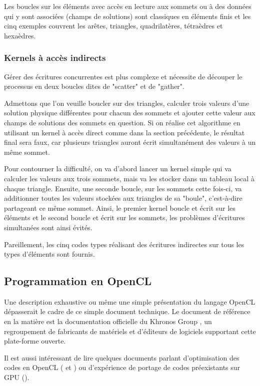 \documentclass[a4paper,12pt]{article}
\begin{document}
Les boucles sur les éléments avec accès en lecture aux sommets ou à des données qui y sont associées (champs de solutions) sont classiques en éléments finis et les cinq exemples couvrent les arêtes, triangles, quadrilatères, tétraèdres et hexaèdres.

\subsubsection*{Kernels à accès indirects}
Gérer des écritures concurrentes est plus complexe et nécessite de découper le processus en deux boucles dites de "scatter" et de "gather".

Admettons que l'on veuille boucler sur des triangles, calculer trois valeurs d'une solution physique différentes pour chacun des sommets et ajouter cette valeur aux champs de solutions des sommets en question. Si on réalise cet algorithme en utilisant un kernel à accès direct comme dans la section précédente, le résultat final sera faux, car plusieurs triangles auront écrit simultanément des valeurs à un même sommet.

Pour contourner la difficulté, on va d'abord lancer un kernel simple qui va calculer les valeurs aux trois sommets, mais va les stocker dans un tableau local à chaque triangle. Ensuite, une seconde boucle, sur les sommets cette fois-ci, va additionner toutes les valeurs stockées aux triangles de sa "boule", c'est-à-dire partageant ce même sommet. Ainsi, le premier kernel boucle et écrit sur les éléments et le second boucle et écrit sur les sommets, les problèmes d'écritures simultanées sont ainsi évités.

Pareillement, les cinq codes types réalisant des écritures indirectes sur tous les types d'éléments sont fournis.


\subsection{Programmation en OpenCL}
Une description exhaustive ou même une simple présentation du langage OpenCL dépasserait le cadre de ce simple document technique. Le document de référence en la matière est la documentation officielle du Khronos Group \cite{khronos}, un regroupement de fabricants de matériels et d'éditeurs de logiciels supportant cette plate-forme ouverte.

Il est aussi intéressant de lire quelques documents parlant d'optimisation des codes en OpenCL (\cite{nvidia} et \cite{apple}) ou d'expérience de portage de codes préexistants sur GPU (\cite{lohner}).
\end{document}
